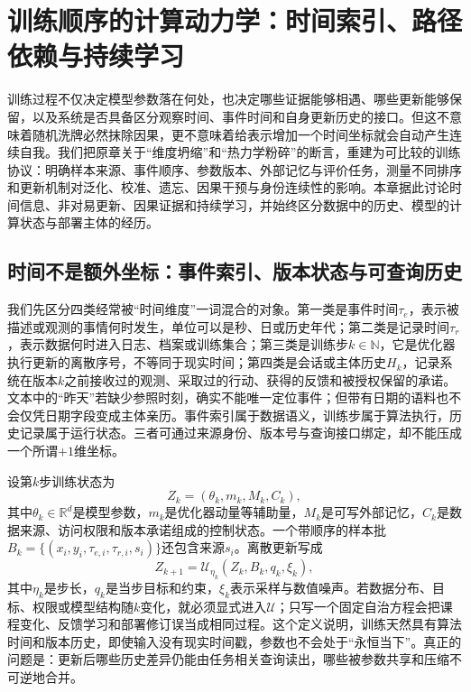 \chapter{训练顺序的计算动力学：时间索引、路径依赖与持续学习}
\label{chp:training_paradigm_original_sin}

训练过程不仅决定模型参数落在何处，也决定哪些证据能够相遇、哪些更新能够保留，以及系统是否具备区分观察时间、事件时间和自身更新历史的接口。但这不意味着随机洗牌必然抹除因果，更不意味着给表示增加一个时间坐标就会自动产生连续自我。我们把原章关于“维度坍缩”和“热力学粉碎”的断言，重建为可比较的训练协议：明确样本来源、事件顺序、参数版本、外部记忆与评价任务，测量不同排序和更新机制对泛化、校准、遗忘、因果干预与身份连续性的影响。本章据此讨论时间信息、非对易更新、因果证据和持续学习，并始终区分数据中的历史、模型的计算状态与部署主体的经历。

\section{时间不是额外坐标：事件索引、版本状态与可查询历史}
\label{sec:dimensional_deficit_time}

我们先区分四类经常被“时间维度”一词混合的对象。第一类是事件时间$\tau_e$，表示被描述或观测的事情何时发生，单位可以是秒、日或历史年代；第二类是记录时间$\tau_r$，表示数据何时进入日志、档案或训练集合；第三类是训练步$k\in\mathbb{N}$，它是优化器执行更新的离散序号，不等同于现实时间；第四类是会话或主体历史$H_k$，记录系统在版本$k$之前接收过的观测、采取过的行动、获得的反馈和被授权保留的承诺。文本中的“昨天”若缺少参照时刻，确实不能唯一定位事件；但带有日期的语料也不会仅凭日期字段变成主体亲历。事件索引属于数据语义，训练步属于算法执行，历史记录属于运行状态。三者可通过来源身份、版本号与查询接口绑定，却不能压成一个所谓$+1$维坐标。

设第$k$步训练状态为
\[
Z_k=(\theta_k,m_k,M_k,C_k),
\]
其中$\theta_k\in\mathbb{R}^d$是模型参数，$m_k$是优化器动量等辅助量，$M_k$是可写外部记忆，$C_k$是数据来源、访问权限和版本承诺组成的控制状态。一个带顺序的样本批$B_k=\{(x_i,y_i,\tau_{e,i},\tau_{r,i},s_i)\}$还包含来源$s_i$。离散更新写成
\[
Z_{k+1}=\mathcal{U}_{\eta_k}(Z_k,B_k,q_k,\xi_k),
\]
其中$\eta_k$是步长，$q_k$是当步目标和约束，$\xi_k$表示采样与数值噪声。若数据分布、目标、权限或模型结构随$k$变化，就必须显式进入$\mathcal{U}$；只写一个固定自治方程会把课程变化、反馈学习和部署修订误当成相同过程。这个定义说明，训练天然具有算法时间和版本历史，即使输入没有现实时间戳，参数也不会处于“永恒当下”。真正的问题是：更新后哪些历史差异仍能由任务相关查询读出，哪些被参数共享和压缩不可逆地合并。

